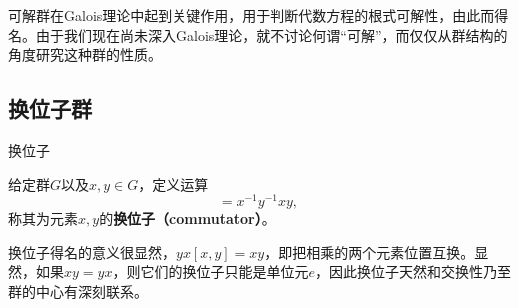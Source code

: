 


可解群在Galois理论中起到关键作用，用于判断代数方程的根式可解性，由此而得名。由于我们现在尚未深入Galois理论，就不讨论何谓“可解”，而仅仅从群结构的角度研究这种群的性质。



\subsection{换位子群}


\begin{definition}{换位子}

给定群$G$以及$x, y\in G$，定义运算
\begin{equation}
[x, y] = x^{-1}y^{-1}xy,~
\end{equation}
称其为元素$x, y$的\textbf{换位子（commutator）}。

\end{definition}


换位子得名的意义很显然，$yx[x, y]=xy$，即把相乘的两个元素位置互换。显然，如果$xy=yx$，则它们的换位子只能是单位元$e$，因此换位子天然和交换性乃至群的中心有深刻联系。
































